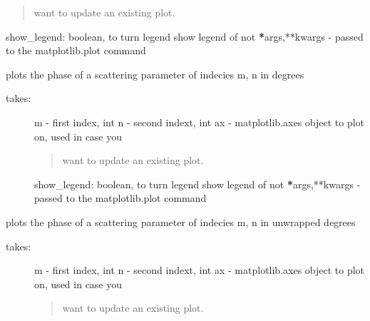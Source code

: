 \documentclass[letterpaper,10pt,english]{sphinxmanual}
\begin{document}
\begin{fulllineitems}
\begin{fulllineitems}
\begin{description}
\begin{quote}
want to update an existing plot.
\end{quote}

show\_legend: boolean, to turn legend show legend of not
{\color{red}\bfseries{}*}args,**kwargs - passed to the matplotlib.plot command

\end{description}

\end{fulllineitems}


\begin{fulllineitems}
\label{api/mwavepy:mwavepy.network.Network.plot_s_deg}
plots the phase of a scattering parameter of indecies m, n in
degrees
\begin{description}
\item[{takes:}] \leavevmode
m - first index, int
n - second indext, int
ax - matplotlib.axes object to plot on, used in case you
\begin{quote}

want to update an existing plot.
\end{quote}

show\_legend: boolean, to turn legend show legend of not
{\color{red}\bfseries{}*}args,**kwargs - passed to the matplotlib.plot command

\end{description}

\end{fulllineitems}


\begin{fulllineitems}
\label{api/mwavepy:mwavepy.network.Network.plot_s_deg_unwrap}
plots the phase of a scattering parameter of indecies m, n in
unwrapped degrees
\begin{description}
\item[{takes:}] \leavevmode
m - first index, int
n - second indext, int
ax - matplotlib.axes object to plot on, used in case you
\begin{quote}

want to update an existing plot.
\end{quote}


\end{description}
\end{fulllineitems}
\end{fulllineitems}
\end{document}
